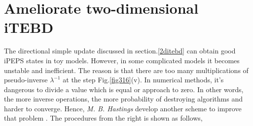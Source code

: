 \section{Ameliorate two-dimensional iTEBD}
\label{2dhastin}

The directional simple update discussed in section.\ref{2ditebd} can obtain good iPEPS states in toy models. However, in some complicated models it becomes unstable and inefficient. The reason is that there are too many multiplications of pseudo-inverse $\lambda^{-1}$ at the step Fig.\ref{fig316}(v). In numerical methods, it's dangerous to divide a value which is equal or approach to zero. In other words, the more inverse operations, the more probability of destroying algorithms and harder to converge. Hence, \textit{M. B. Hastings} develop another scheme to improve that problem \cite{hastings_light-cone_2009}. The procedures from the right is shown as follows,
